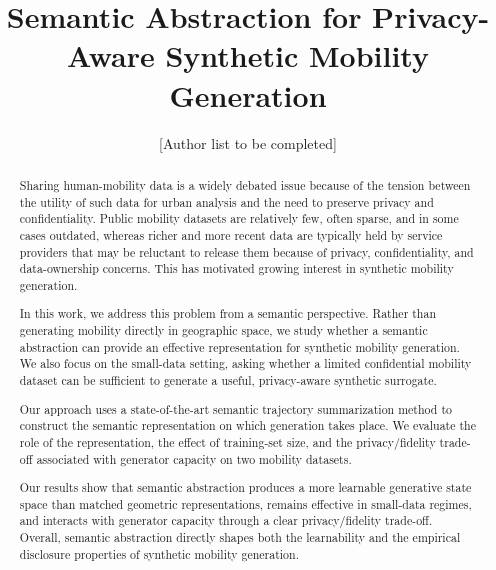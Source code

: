 \documentclass[sigconf,nonacm]{acmart}
\begin{document}
\title{Semantic Abstraction for Privacy-Aware Synthetic Mobility Generation}

\author{[Author list to be completed]}

\renewcommand{\shortauthors}{Draft v0.1}

\begin{abstract}
Sharing human-mobility data is a widely debated issue because of the
tension between the utility of such data for urban analysis and the
need to preserve privacy and confidentiality. Public mobility datasets
are relatively few, often sparse, and in some cases outdated, whereas
richer and more recent data are typically held by service providers
that may be reluctant to release them because of privacy, confidentiality,
and data-ownership concerns. This has motivated growing interest in
synthetic mobility generation.

In this work, we address this problem from a semantic perspective.
Rather than generating mobility directly in geographic space, we study
whether a semantic abstraction can provide an effective representation
for synthetic mobility generation. We also focus on the small-data
setting, asking whether a limited confidential mobility dataset can be
sufficient to generate a useful, privacy-aware synthetic surrogate.

Our approach uses a state-of-the-art semantic trajectory summarization
method to construct the semantic representation on which generation
takes place. We evaluate the role of the representation, the effect of
training-set size, and the privacy/fidelity trade-off associated with
generator capacity on two mobility datasets.

Our results show that semantic abstraction produces a more learnable
generative state space than matched geometric representations, remains
effective in small-data regimes, and interacts with generator capacity
through a clear privacy/fidelity trade-off. Overall, semantic
abstraction directly shapes both the learnability and the empirical
disclosure properties of synthetic mobility generation. 

\end{abstract}


\maketitle
\end{document}
